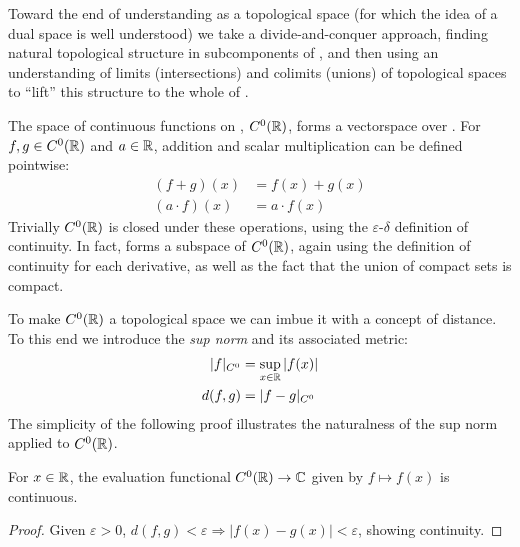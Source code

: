 \documentclass[thesis.tex]{subfiles}
\begin{document}

      Toward the end of understanding \D as a topological space (for which the idea of a dual space is well understood) we take a divide-and-conquer approach, finding natural topological structure in subcomponents of \D, and then using an understanding of limits (intersections) and colimits (unions) of topological spaces to ``lift'' this structure to the whole of \D.

      The space of continuous functions on \R, $C^0(\mathbb{R})$, forms a vectorspace over \R.
      For $f,g\in C^0(\mathbb{R})$ and $a\in\mathbb{R}$, addition and scalar multiplication can be defined pointwise: 
      \begin{align*}
        (f+g)(x) &= f(x)+g(x)\\
        (a\cdot f)(x) &= a\cdot f(x)
      \end{align*}
      Trivially $C^0(\mathbb{R})$ is closed under these operations, using the $\varepsilon$-$\delta$ definition of continuity.
      In fact, \D forms a subspace of $C^0(\mathbb{R})$, again using the definition of continuity for each derivative, as well as the fact that the union of compact sets is compact.

      To make $C^0(\mathbb{R})$ a topological space we can imbue it with a concept of distance.
      To this end we introduce the \emph{sup norm} and its associated metric:
      \begin{align*}
        |f|_{C^0} &= \sup_{x\in\mathbb{R}}|f(x)|\\
        d(f,g) &= |f-g|_{C^0}
      \end{align*}
      The simplicity of the following proof illustrates the naturalness of the sup norm applied to $C^0(\mathbb{R})$.

      \begin{claim}
        For $x\in\mathbb{R}$, the evaluation functional $C^0(\mathbb{R})\rightarrow\mathbb{C}$ given by $f\mapsto f(x)$ is continuous.
        \begin{proof}
          Given $\varepsilon > 0$, $d(f,g)<\varepsilon \Rightarrow |f(x)-g(x)|<\varepsilon$, showing continuity.
        \end{proof}
      \end{claim}
\end{document}

